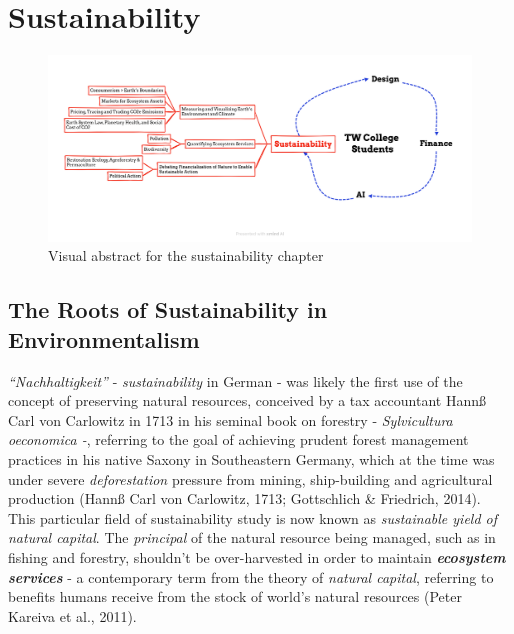 \documentclass[
  letterpaper,
  DIV=11,
  numbers=noendperiod]{scrartcl}
\begin{document}
\newpage

\section{Sustainability}\label{sustainability}

\begin{figure}[H]

{\centering \includegraphics{./images/sustainability/abstract-sustainability.png}

}

\caption{Visual abstract for the sustainability chapter}

\end{figure}%

\subsection{The Roots of Sustainability in
Environmentalism}\label{the-roots-of-sustainability-in-environmentalism}

\emph{``Nachhaltigkeit''} - \emph{sustainability} in German - was likely
the first use of the concept of preserving natural resources, conceived
by a tax accountant Hannß Carl von Carlowitz in 1713 in his seminal book
on forestry - \emph{Sylvicultura oeconomica -}, referring to the goal of
achieving prudent forest management practices in his native Saxony in
Southeastern Germany, which at the time was under severe
\emph{deforestation} pressure from mining, ship-building and
agricultural production (Hannß Carl von Carlowitz, 1713; Gottschlich \&
Friedrich, 2014). This particular field of sustainability study is now
known as \emph{sustainable yield of natural capital}. The
\emph{principal} of the natural resource being managed, such as in
fishing and forestry, shouldn't be over-harvested in order to maintain
\textbf{\emph{ecosystem services}} - a contemporary term from the theory
of \emph{natural capital}, referring to benefits humans receive from the
stock of world's natural resources (Peter Kareiva et al., 2011).
\end{document}
